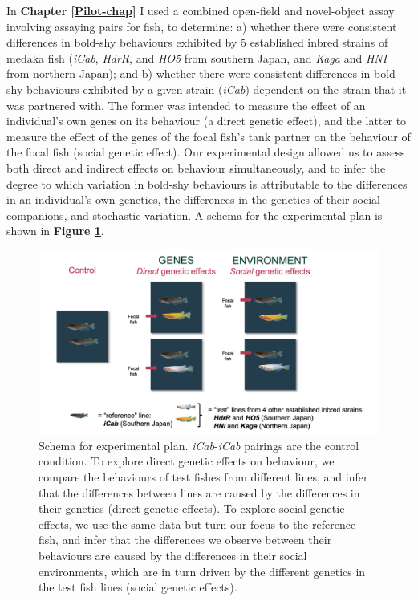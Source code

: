 \documentclass[
]{book}
\begin{document}
In \textbf{Chapter \ref{Pilot-chap}} I used a combined open-field and novel-object assay involving assaying pairs for fish, to determine: a) whether there were consistent differences in bold-shy behaviours exhibited by 5 established inbred strains of medaka fish (\emph{iCab}, \emph{HdrR}, and \emph{HO5} from southern Japan, and \emph{Kaga} and \emph{HNI} from northern Japan); and b) whether there were consistent differences in bold-shy behaviours exhibited by a given strain (\emph{iCab}) dependent on the strain that it was partnered with. The former was intended to measure the effect of an individual's own genes on its behaviour (a direct genetic effect), and the latter to measure the effect of the genes of the focal fish's tank partner on the behaviour of the focal fish (social genetic effect). Our experimental design allowed us to assess both direct and indirect effects on behaviour simultaneously, and to infer the degree to which variation in bold-shy behaviours is attributable to the differences in an individual's own genetics, the differences in the genetics of their social companions, and stochastic variation. A schema for the experimental plan is shown in \textbf{Figure \ref{fig:behavioural-schema}}.



\begin{figure}
\includegraphics[width=1\linewidth]{figs/pilot/experimental_schema} \caption{Schema for experimental plan. \emph{iCab}-\emph{iCab} pairings are the control condition. To explore direct genetic effects on behaviour, we compare the behaviours of test fishes from different lines, and infer that the differences between lines are caused by the differences in their genetics (direct genetic effects). To explore social genetic effects, we use the same data but turn our focus to the reference fish, and infer that the differences we observe between their behaviours are caused by the differences in their social environments, which are in turn driven by the different genetics in the test fish lines (social genetic effects).}\label{fig:behavioural-schema}
\end{figure}
\end{document}
